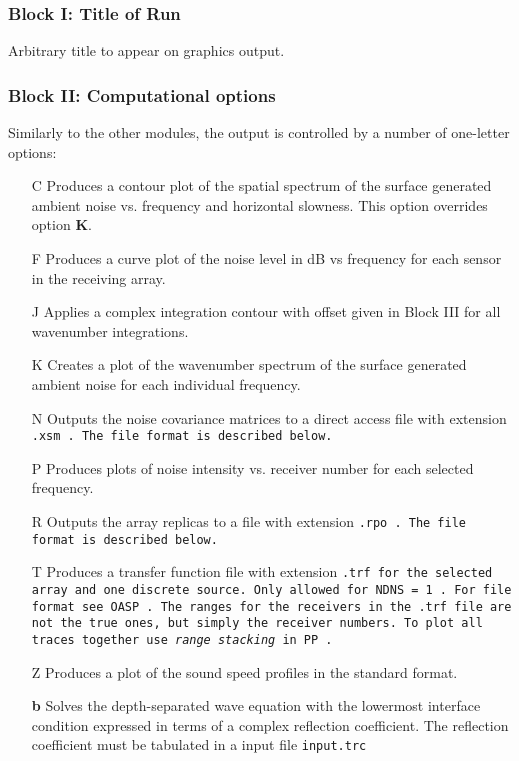 \subsubsection{Block I: Title of Run}

Arbitrary title to appear on graphics output.

\subsubsection{Block II: Computational options}

Similarly to the other modules, the output is controlled by a number
of one-letter options:
\begin{itemize}
\item[C] Produces a contour plot of the spatial spectrum of the
surface generated ambient noise vs. frequency and horizontal slowness.
This
option overrides option {\bf K}.
\item[F] Produces a curve plot of the noise level in dB vs frequency for each
sensor in the receiving array.
\item[J] Applies a complex integration contour with offset given in
Block III for all wavenumber integrations.
\item[K] Creates a plot of the wavenumber spectrum of the surface
generated ambient noise for each individual frequency.
\item[N] Outputs the noise covariance matrices to a direct access
file with extension \tt .xsm \rm. The file format is described below.
\item[P] Produces plots of noise intensity vs. receiver number for
each selected frequency.
\item[R] Outputs the array replicas to a 
file with extension \tt .rpo \rm. The file format is described below.
\item[T] Produces a transfer function file with extension \tt .trf \rm 
for the selected array and 
one discrete source. Only allowed for \tt NDNS = 1 \rm. 
For file format see \tt OASP \rm. The ranges for the receivers in the 
\tt .trf \rm file are not the true ones, but simply the receiver numbers.
To plot all traces together use {\em range stacking} in \tt PP \rm.
\item[Z] Produces a plot of the sound speed profiles in the standard
format.
    \item[{\bf b}] Solves the depth-separated wave equation with the
lowermost  interface condition expressed in terms of a complex
reflection coefficient. The reflection coefficient must be tabulated in a input file \tt input.trc \rm

\end{itemize}
